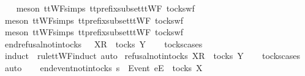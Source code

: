\begin{isabellebody}
\ \ \isamarkupfalse%
\ {\isacharparenleft}meson\ ttWF{\isachardot}simps{\isacharparenleft}{}{}{\isacharparenright}\ tt{\isacharunderscore}prefix{\isacharunderscore}subset{\isacharunderscore}ttWF\ tocks{\isacharunderscore}wf{\isacharparenright}\isanewline
\ \ \isamarkupfalse%
\ {\isacharparenleft}meson\ ttWF{\isachardot}simps{\isacharparenleft}{}{}{\isacharparenright}\ tt{\isacharunderscore}prefix{\isacharunderscore}subset{\isacharunderscore}ttWF\ tocks{\isacharunderscore}wf{\isacharparenright}\isanewline
\ \ \isamarkupfalse%
\ {\isacharparenleft}meson\ ttWF{\isachardot}simps{\isacharparenleft}{}{\isacharparenright}\ tt{\isacharunderscore}prefix{\isacharunderscore}subset{\isacharunderscore}ttWF\ tocks{\isacharunderscore}wf{\isacharparenright}%
\endisatagproof
{\isafoldproof}%
%
\isadelimproof
\isanewline
%
\endisadelimproof
\isanewline
{}\isamarkupfalse%
\ end{\isacharunderscore}refusal{\isacharunderscore}notin{\isacharunderscore}tocks{\isacharcolon}\ {\isachardoublequoteopen}{\isasymrho}\ {\isacharat}\ {\isacharbrackleft}{\isacharbrackleft}X{\isacharbrackright}\isactrlsub R{\isacharbrackright}\ {\isasymnotin}\ tocks\ Y{\isachardoublequoteclose}\isanewline
%
\isadelimproof
\ \ %
\endisadelimproof
%
\isatagproof
{}\isamarkupfalse%
\ tocks{\isachardot}cases\ \isamarkupfalse%
\ {\isacharparenleft}induct\ {\isasymrho}\ rule{\isacharcolon}ttWF{\isachardot}induct{\isacharcomma}\ auto{\isacharparenright}%
\endisatagproof
{\isafoldproof}%
%
\isadelimproof
\isanewline
%
\endisadelimproof
\isanewline
{}\isamarkupfalse%
\ refusal{\isacharunderscore}notin{\isacharunderscore}tocks{\isacharcolon}\ {\isachardoublequoteopen}{\isacharbrackleft}{\isacharbrackleft}X{\isacharbrackright}\isactrlsub R{\isacharbrackright}\ {\isasymnotin}\ tocks\ Y{\isachardoublequoteclose}\isanewline
%
\isadelimproof
\ \ %
\endisadelimproof
%
\isatagproof
{}\isamarkupfalse%
\ tocks{\isachardot}cases\ \isamarkupfalse%
\ auto%
\endisatagproof
{\isafoldproof}%
%
\isadelimproof
\isanewline
%
\endisadelimproof
\ \ \isanewline
{}\isamarkupfalse%
\ end{\isacharunderscore}event{\isacharunderscore}notin{\isacharunderscore}tocks{\isacharcolon}\ {\isachardoublequoteopen}s\ {\isacharat}\ {\isacharbrackleft}{\isacharbrackleft}Event\ e{\isacharbrackright}\isactrlsub E{\isacharbrackright}\ {\isasymnotin}\ tocks\ X{\isachardoublequoteclose}\isanewline
%
\isadelimproof
\ \ %
\endisadelimproof
%

\end{isabellebody}
